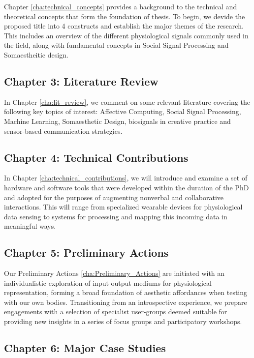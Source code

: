 Chapter \ref{cha:technical_concepts} provides a background to the technical and theoretical concepts that form the foundation of thesis. To begin, we devide the proposed title into 4 constructs and establish the major themes of the research. This includes an overview of the different physiological signals commonly used in the field, along with fundamental concepts in Social Signal Processing and Somaestheitic design.

\subsection{Chapter 3: Literature Review}

In Chapter \ref{cha:lit_review}, we comment on some relevant literature covering the following key topics of interest: Affective Computing, Social Signal Processing, Machine Learning, Somaesthetic Design, biosignals in creative practice and sensor-based communication strategies.

\subsection{Chapter 4: Technical Contributions}

In Chapter \ref{cha:technical_contributions}, we will introduce and examine a set of hardware and software tools that were developed within the duration of the PhD and adopted for the purposes of augmenting nonverbal and collaborative interactions. This will range from specialized wearable devices for physiological data sensing to systems for processing and mapping this incoming data in meaningful ways. 

\subsection{Chapter 5: Preliminary Actions}

Our Preliminary Actions \ref{cha:Preliminary_Actions} are initiated with an individualistic exploration of input-output mediums for physiological representation, forming a broad foundation of aesthetic affordances when testing with our own bodies. Transitioning from an introspective experience, we prepare engagements with a selection of specialist user-groups deemed suitable for providing new insights in a series of focus groups and participatory workshops.

\subsection{Chapter 6: Major Case Studies}

